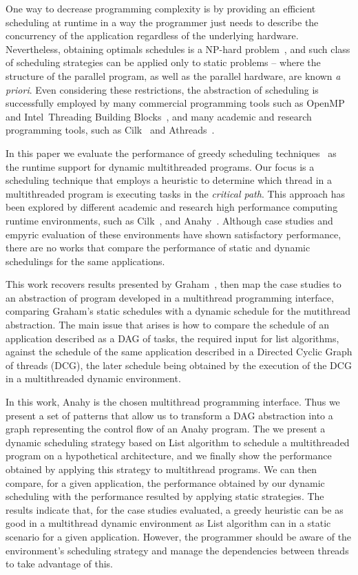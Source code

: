 \documentclass[twocolumn]{svjour3}
\begin{document}
One way to decrease programming complexity is by providing an efficient scheduling at runtime {\color{blue}in a way} the programmer just needs to describe the concurrency of the application regardless of the underlying hardware. Nevertheless, obtaining optimals schedules is a NP-hard problem~\cite{casavant88}, and such class of scheduling strategies can be applied only to static problems -- where the structure of the parallel program, as well as the parallel hardware, are known {\em a priori}. Even considering these restrictions, the abstraction of scheduling is successfully employed by many {\color{blue}commercial} programming tools such as OpenMP~\cite{ChandraOpenMP} and Intel\textregistered~Threading Building Blocks~\cite{TBB2007}, and many academic and research programming tools, such as Cilk~\cite{Cilk95} and Athreads~\cite{VecParLNCS}.

In this paper we evaluate the performance of greedy scheduling techniques~\cite{ListScheduling1989,ListScheduling1990} as the runtime support for dynamic multithreaded programs. Our focus is a scheduling technique that employs a heuristic to determine which thread in a multithreaded program is executing tasks in the \emph{critical path}. This approach has been explored by different academic and research high performance computing runtime environments, such as Cilk~\cite{Cilk95}, and Anahy~\cite{VecParLNCS}. Although case studies and empyric evaluation of these environments have shown satisfactory performance, there are no works that compare the performance of static and dynamic schedulings for the same applications. 

This work recovers results presented by Graham~\cite{Graham76}, then map the case studies to an abstraction of program developed in a multithread programming interface, comparing Graham's static schedules with a dynamic schedule for the mutithread abstraction. The main issue that arises is how to compare the schedule of an application described as a DAG of tasks, the required input for list algorithms, against the schedule of the same application described in a {\color{blue}Directed Cyclic Graph} of threads (DCG), the later schedule being obtained by the execution of the DCG in a multithreaded dynamic environment.

In this work, Anahy is the chosen multithread programming interface. Thus we present a set of patterns that allow us to transform a DAG abstraction into a graph representing the control flow of an Anahy program. The we present a dynamic scheduling strategy based on List algorithm to schedule a multithreaded program on a hypothetical architecture, and we finally show the performance obtained by applying this strategy to multithread programs. We can then compare, for a given application, the performance obtained by our dynamic scheduling with the performance resulted by applying static strategies. The results indicate that, for the case studies evaluated, a greedy heuristic can be as good in a multithread dynamic environment as List algorithm can in a static scenario for a given application. However, the programmer should be aware of the environment's scheduling strategy and manage the {\color{blue}dependencies} between threads to take advantage of this.
\end{document}
